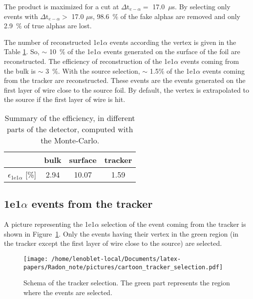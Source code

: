 \documentclass[main.tex]{subfiles}
\begin{document}
\bigskip

\noindent The product is maximized for a cut at $\Delta \text{t}_{e-\alpha} =$ 17.0~$\mu$s. By selecting only events with $\Delta \text{t}_{e-\alpha} >$ 17.0 $\mu$s, 98.6~$\%$ of the fake alphas are removed and only 2.9~$\%$ of true alphas are lost.

\bigskip

\noindent The number of reconstructed 1e1$\alpha$ events according the vertex is given in the Table \ref{efficiency_different_parts_foil_source}. So, $\sim$ 10~\% of the 1e1$\alpha$ events generated on the surface of the foil are reconstructed. The efficiency of reconstruction of the 1e1$\alpha$ events coming from the bulk is $\sim$ 3~\%. With the source selection, $\sim$ 1.5\% of the 1e1$\alpha$ events coming from the tracker are reconstructed. These events are the events generated on the first layer of wire close to the source foil. By default, the vertex is extrapolated to the source if the first layer of wire is hit.


\begin{table}[h!]
\begin{center}
\begin{tabular}{c|c|c|c}
           & bulk   & surface & tracker \\
\hline
$\epsilon_{\text{1e1}\alpha}$ [\%] & 2.94 & 10.07  & 1.59 \\
\hline
\end{tabular}
\end{center}
\caption{Summary of the efficiency, in different parts of the detector, computed with the Monte-Carlo.}
\label{efficiency_different_parts_foil_source}
\end{table}


\FloatBarrier


\subsection{1e1$\alpha$ events from the tracker}


\noindent A picture representing the 1e1$\alpha$ selection of the event coming from the tracker is shown in Figure~\ref{cartoon_tracker_selection}. Only the events having their vertex in the green region (in the tracker except the first layer of wire close to the source) are selected.

 
\begin{figure}[h!]
\begin{center}
\texttt{[image: /home/lenoblet-local/Documents/latex-papers/Radon\_note/pictures/cartoon\_tracker\_selection.pdf]}
\caption{Schema of the tracker selection. The green part represents the region where the events are selected.}
\label{cartoon_tracker_selection}
\end{center}
\end{figure}
\end{document}
